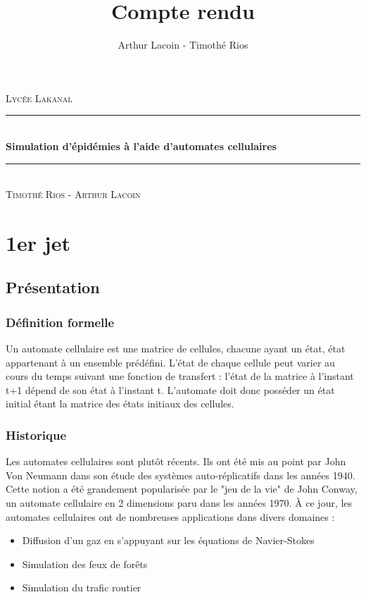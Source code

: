 \documentclass{article}
\title{Compte rendu}
\author{Arthur Lacoin - Timothé Rios}
\date{}
\newcommand{\HRule}{\rule{\linewidth}{0.5mm}}
\begin{document}
\begin{titlepage}
    \begin{sffamily}
    \begin{center}

        \textsc{\LARGE Lycée Lakanal}~\\[2cm]

        \HRule \\[0.4cm]
        { \huge \bfseries Simulation d'épidémies à l'aide d'automates cellulaires\\[0.4cm] }
    
        \HRule \\[2cm]
        \textsc{\Large Timothé Rios - Arthur Lacoin}\\[2cm]

    \end{center}
\end{sffamily}
\end{titlepage}

\begin{abstract}

\end{abstract}

\section{1er jet}

\subsection{Présentation}

\subsubsection{Définition formelle}
	Un automate cellulaire est une matrice de cellules, chacune ayant un état, état appartenant à un ensemble prédéfini. L'état de chaque cellule peut varier au cours du temps suivant une fonction de transfert : l'état de la matrice à l'instant t+1 dépend de son état à l'instant t. L'automate doit donc posséder un état initial étant la matrice des états initiaux des cellules.

\subsubsection{Historique}
	Les automates cellulaires sont plutôt récents. Ils ont été mis au point par John Von Neumann dans son étude des systèmes auto-réplicatifs dans les années 1940. Cette notion a été grandement popularisée par le "jeu de la vie" de John Conway, un automate cellulaire en 2 dimensions paru dans les années 1970. À ce jour, les automates cellulaires ont de nombreuses applications dans divers domaines :
	\begin{itemize}
	\item Diffusion d'un gaz en s'appuyant sur les équations de Navier-Stokes
	\item Simulation des feux de forêts
	\item Simulation du trafic routier
	\end{itemize}
\end{document}
